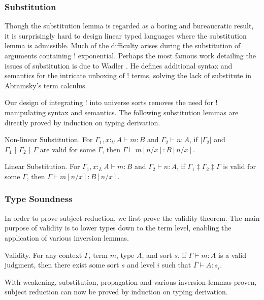 \documentclass[sigplan,screen,review,authordraft]{acmart}
\newcommand{\pure}[1]{|#1|}
\newcommand{\utype}{:_{\scriptscriptstyle U}}
\newcommand{\ltype}{:_{\scriptscriptstyle L}}
\newcommand{\mrg}[3]{#1\ddagger#2\ddagger#3}
\begin{document}
\subsubsection{Substitution} \label{subst}
Though the substitution lemma is regarded as a boring and bureaucratic result, it is surprisingly hard to design linear typed languages where the substitution lemma is admissible. Much of the difficulty arises during the substitution of arguments containing ! exponential. Perhaps the most famous work detailing the issues of substitution is due to Wadler \cite{substitute}. He defines additional syntax and semantics for the intricate unboxing of ! terms, solving the lack of substitute in Abramsky's term calculus.

Our design of integrating ! into universe sorts removes the need for ! manipulating syntax and semantics. The following substitution lemmas are directly proved by induction on typing derivation.

\begin{lemma}
  Non-linear Substitution. For $\Gamma_1, x \utype A \vdash m : B$ and $\Gamma_2 \vdash n : A$, if $\pure{\Gamma_2}$ and $\mrg{\Gamma_1}{\Gamma_2}{\Gamma}$ are valid for some $\Gamma$, then $\Gamma \vdash m[n/x] : B[n/x]$.
\end{lemma}

\begin{lemma}
  Linear Substitution. For $\Gamma_1, x \ltype A \vdash m : B$ and $\Gamma_2 \vdash n : A$, if $\mrg{\Gamma_1}{\Gamma_2}{\Gamma}$ is valid for some $\Gamma$, then $\Gamma \vdash m[n/x] : B[n/x]$.
\end{lemma}

\subsubsection{Type Soundness}
In order to prove subject reduction, we first prove the validity theorem. The main purpose of validity is to lower types down to the term level, enabling the application of various inversion lemmas.

\begin{theorem}
  Validity. For any context $\Gamma$, term $m$, type $A$, and sort $s$, if $\Gamma \vdash m : A$ is a valid judgment, then there exist some sort $s$ and level $i$ such that $\overline{\Gamma} \vdash A : s_i$.
  \label{validity}
\end{theorem}

With weakening, substitution, propagation and various inversion lemmas proven, subject reduction can now be proved by induction on typing derivation.
\end{document}
